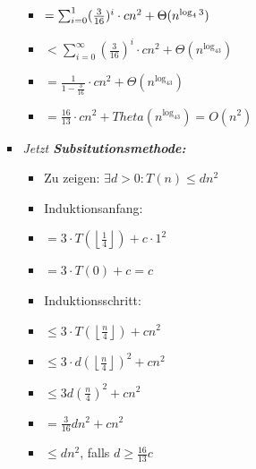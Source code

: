 \documentclass[
    ngerman,
    color=3b,
    load_common, %
    summary,
    boxarc,
]{tuda_summary}
\begin{document}
\begin{itemize}
\begin{itemize}
\begin{itemize}
\begin{itemize}
                                  \item[] {}  $= \sum^{\-1}_{i=0} (\frac{3}{16})^i \cdot cn^2 + \Theta(n^{\log_43})$
                                  \item[] {\makebox[0.73cm][l]{}} $< \sum^{\infty}_{i=0} (\frac{3}{16})^i \cdot cn^2 + \Theta(n^{\log_43})$
                                  \item[] {\makebox[0.75cm][l]{}} $= \frac{1}{1-\frac{3}{16}} \cdot cn^2 + \Theta(n^{\log_43})$
                                  \item[] {\makebox[0.75cm][l]{}} $ = \frac{16}{13} \cdot cn^2 + Theta(n^{\log_43}) = O(n^2)$
                              \end{itemize}
                        \item \textit{Jetzt \textbf{Subsitutionsmethode:}}
                              \begin{itemize}
                                  \item Zu zeigen: $\exists d > 0: T(n) \leq dn^2$
                                  \item Induktionsanfang:
                                  \item[] {} $= 3 \cdot T(\left \lfloor \frac{1}{4} \right \rfloor) + c \cdot 1^2$
                                  \item[] {\makebox[0.75cm][l]{}} $= 3 \cdot T(0) + c = c$
                                  \item Induktionsschritt:
                                  \item[] {} $\leq 3 \cdot T(\left \lfloor \frac{n}{4} \right \rfloor) + cn^2$
                                  \item[] {\makebox[0.75cm][l]{}} $\leq 3 \cdot d(\left \lfloor \frac{n}{4} \right \rfloor)^2+cn^2$
                                  \item[] {\makebox[0.75cm][l]{}} $\leq 3d(\frac{n}{4})^2 + cn^2$
                                  \item[] {\makebox[0.75cm][l]{}} $= \frac{3}{16}dn^2+cn^2$
                                  \item[] {\makebox[0.75cm][l]{}} $\leq dn^2$, falls $d \geq \frac{16}{13}c$
                              \end{itemize}

                    \end{itemize}
          \end{itemize}


\end{itemize}
\end{document}
